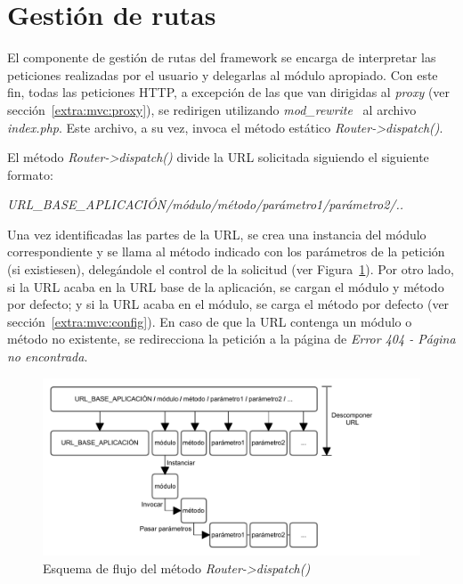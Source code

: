 \section{Gestión de rutas\label{extra:mvc:router}}

El componente de gestión de rutas del \gls{framework} se encarga de interpretar las peticiones realizadas por el usuario y delegarlas al módulo apropiado.
Con este fin, todas las peticiones \gls{HTTP}, a excepción de las que van dirigidas al \textit{proxy} (ver sección~\ref{extra:mvc:proxy}), se redirigen utilizando \textit{mod\_rewrite}~\cite{modrewrite} al archivo \textit{index.php}.
Este archivo, a su vez, invoca el método estático \textit{Router->dispatch()}.

El método \textit{Router->dispatch()} divide la \gls{URL} solicitada siguiendo el siguiente formato:

\textit{URL\_BASE\_APLICACIÓN/módulo/método/parámetro1/parámetro2/..}

Una vez identificadas las partes de la \gls{URL}, se crea una instancia del módulo correspondiente y se llama al método indicado con los parámetros de la petición (si existiesen), delegándole el control de la solicitud (ver Figura~\ref{fig:router}).
Por otro lado, si la \gls{URL} acaba en la \gls{URL} base de la aplicación, se cargan el módulo y método por defecto; y si la \gls{URL} acaba en el módulo, se carga el método por defecto (ver sección~\ref{extra:mvc:config}).
En caso de que la \gls{URL} contenga un módulo o método no existente, se redirecciona la petición a la página de \textit{Error 404 - Página no encontrada}.

\begin{figure}[!htp]
  \centering
  \includegraphics[width=\textwidth,clip=true]{graphics/router}
  \caption{Esquema de flujo del método \textit{Router->dispatch()}}
  \label{fig:router}
\end{figure}


